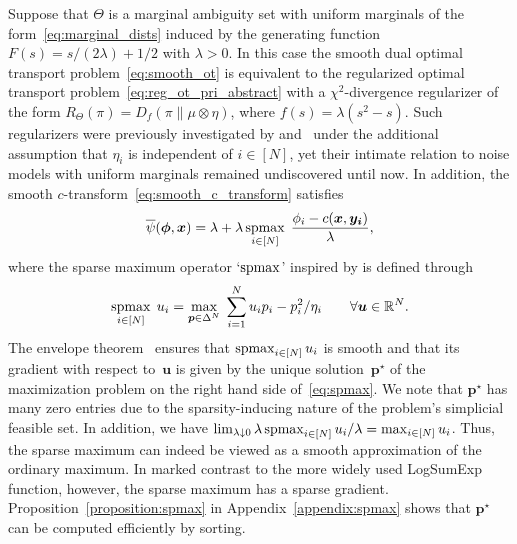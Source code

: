 \documentclass[11pt, a4paper, oneside, reqno]{article}
\begin{document}
	
	\begin{example}
		\label{ex:uniform}
		Suppose that $\Theta$ is a marginal ambiguity set with uniform marginals  of the form~\eqref{eq:marginal_dists} induced by the generating function $F(s) = s/(2\lambda) + 1/2$ with $\lambda > 0$.
		In this case the smooth dual optimal transport problem~\eqref{eq:smooth_ot} is equivalent to the regularized optimal transport problem~\eqref{eq:reg_ot_pri_abstract} with a $\chi^2$-divergence regularizer of the form $R_\Theta(\pi) = D_f(\pi \| \mu \otimes \eta)$, where $f(s) = \lambda (s^2 -s)$. Such regularizers were previously investigated by \citet{blondel2017smooth} and~\citet{seguy2017large} under the additional assumption that $\eta_i$ is independent of $i\in[N]$, yet their intimate relation to noise models with uniform marginals remained undiscovered until now. In addition, the smooth $c$-transform~\eqref{eq:smooth_c_transform} satisfies
		\begin{align*}
		    \overline\psi(\boldsymbol \phi, \boldsymbol x) = \lambda + \lambda \operatorname*{spmax}_{i \in [N]} \;\frac{\phi_i - c(\boldsymbol x, \boldsymbol {y_i})}{\lambda},
		\end{align*}
		where the sparse maximum operator `$\operatorname*{spmax}$'  inspired by \citet{sparsemax} is defined through
		\begin{align}
		    \label{eq:spmax}
		    \operatorname*{spmax}_{i \in [N]} \; u_i = \max_{\boldsymbol p \in \Delta^N} \; \sum_{i=1}^N u_i p_i - {p_i^2}/{\eta_i} \qquad \forall \bm u\in\mathbb{R}^N.
		\end{align}
		The envelope theorem~\citep[Theorem~2.16]{de2000mathematical} ensures that $\operatorname*{spmax}_{i \in[N]} u_i$ is smooth and that its gradient with respect to~$\bm u$ is given by the unique solution~$\bm p^\star$ of the maximization problem on the right hand side of~\eqref{eq:spmax}. We note that $\bm p^\star$ has many zero entries due to the sparsity-inducing nature of the problem's simplicial feasible set. In addition, we have $\lim_{\lambda\downarrow 0} \lambda \operatorname*{spmax}_{i \in [N]} u_i/\lambda = \max_{i\in[N]}u_i$. Thus, the sparse maximum can indeed be viewed as a smooth approximation of the ordinary maximum. In marked contrast to the more widely used LogSumExp function, however, the sparse maximum has a sparse gradient. Proposition~\ref{proposition:spmax} in Appendix~\ref{appendix:spmax} shows that $\bm p^\star$ can be computed efficiently by sorting.
	\end{example}
	
\end{document}
